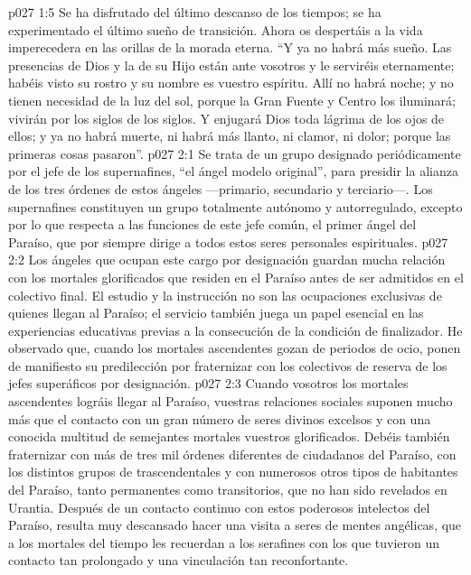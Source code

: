 \vs p027 1:5 Se ha disfrutado del último descanso de los tiempos; se ha experimentado el último sueño de transición. Ahora os despertáis a la vida imperecedera en las orillas de la morada eterna. “Y ya no habrá más sueño. Las presencias de Dios y la de su Hijo están ante vosotros y le serviréis eternamente; habéis visto su rostro y su nombre es vuestro espíritu. Allí no habrá noche; y no tienen necesidad de la luz del sol, porque la Gran Fuente y Centro los iluminará; vivirán por los siglos de los siglos. Y enjugará Dios toda lágrima de los ojos de ellos; y ya no habrá muerte, ni habrá más llanto, ni clamor, ni dolor; porque las primeras cosas pasaron”.
\vs p027 2:1 Se trata de un grupo designado periódicamente por el jefe de los supernafines, “el ángel modelo original”, para presidir la alianza de los tres órdenes de estos ángeles ---primario, secundario y terciario---. Los supernafines constituyen un grupo totalmente autónomo y autorregulado, excepto por lo que respecta a las funciones de este jefe común, el primer ángel del Paraíso, que por siempre dirige a todos estos seres personales espirituales.
\vs p027 2:2 Los ángeles que ocupan este cargo por designación guardan mucha relación con los mortales glorificados que residen en el Paraíso antes de ser admitidos en el colectivo final. El estudio y la instrucción no son las ocupaciones exclusivas de quienes llegan al Paraíso; el servicio también juega un papel esencial en las experiencias educativas previas a la consecución de la condición de finalizador. He observado que, cuando los mortales ascendentes gozan de periodos de ocio, ponen de manifiesto su predilección por fraternizar con los colectivos de reserva de los jefes superáficos por designación.
\vs p027 2:3 Cuando vosotros los mortales ascendentes lográis llegar al Paraíso, vuestras relaciones sociales suponen mucho más que el contacto con un gran número de seres divinos excelsos y con una conocida multitud de semejantes mortales vuestros glorificados. Debéis también fraternizar con más de tres mil órdenes diferentes de ciudadanos del Paraíso, con los distintos grupos de trascendentales y con numerosos otros tipos de habitantes del Paraíso, tanto permanentes como transitorios, que no han sido revelados en Urantia. Después de un contacto continuo con estos poderosos intelectos del Paraíso, resulta muy descansado hacer una visita a seres de mentes angélicas, que a los mortales del tiempo les recuerdan a los serafines con los que tuvieron un contacto tan prolongado y una vinculación tan reconfortante.
